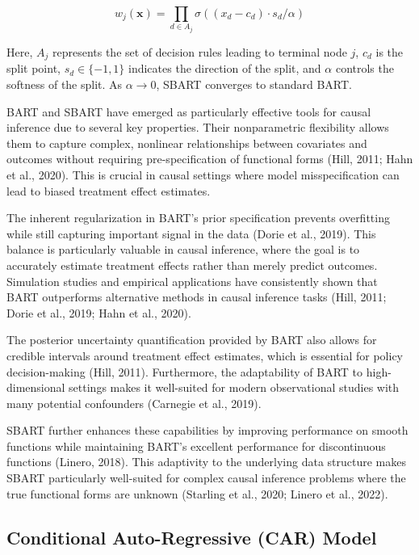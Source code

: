 \documentclass[useAMS,referee]{biom}
\begin{document}
\begin{equation}
w_j(\mathbf{x}) = \prod_{d \in A_j} \sigma((x_d - c_d) \cdot s_d / \alpha)
\end{equation}

Here, $A_j$ represents the set of decision rules leading to terminal node $j$, $c_d$ is the split point, $s_d \in \{-1, 1\}$ indicates the direction of the split, and $\alpha$ controls the softness of the split. As $\alpha \rightarrow 0$, SBART converges to standard BART.

BART and SBART have emerged as particularly effective tools for causal inference due to several key properties. Their nonparametric flexibility allows them to capture complex, nonlinear relationships between covariates and outcomes without requiring pre-specification of functional forms (Hill, 2011; Hahn et al., 2020). This is crucial in causal settings where model misspecification can lead to biased treatment effect estimates. 

The inherent regularization in BART's prior specification prevents overfitting while still capturing important signal in the data (Dorie et al., 2019). This balance is particularly valuable in causal inference, where the goal is to accurately estimate treatment effects rather than merely predict outcomes. Simulation studies and empirical applications have consistently shown that BART outperforms alternative methods in causal inference tasks (Hill, 2011; Dorie et al., 2019; Hahn et al., 2020).

The posterior uncertainty quantification provided by BART also allows for credible intervals around treatment effect estimates, which is essential for policy decision-making (Hill, 2011). Furthermore, the adaptability of BART to high-dimensional settings makes it well-suited for modern observational studies with many potential confounders (Carnegie et al., 2019).

SBART further enhances these capabilities by improving performance on smooth functions while maintaining BART's excellent performance for discontinuous functions (Linero, 2018). This adaptivity to the underlying data structure makes SBART particularly well-suited for complex causal inference problems where the true functional forms are unknown (Starling et al., 2020; Linero et al., 2022).

\subsection{Conditional Auto-Regressive (CAR) Model}
\end{document}
